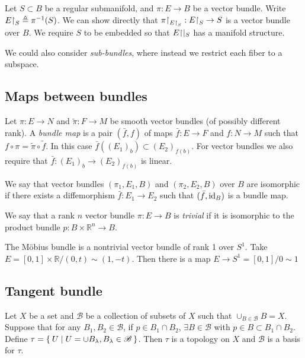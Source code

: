 \begin{xmpl}
Let $S \subset B$ be a regular submanifold, and
$\pi: E \to B$ be a vector bundle. Write
$E\mathord{\upharpoonright}_S \triangleq \pi^{-1}(S)$. We can show directly that
$\pi\mathord{\upharpoonright}_{E\mathord{\upharpoonright}_{S}}: E\mathord{\upharpoonright}_S \to S$ is a vector bundle
over $B$. We require $S$ to be embedded so that $E\mathord{\upharpoonright}|_S$ has a
manifold structure.
\end{xmpl}

We could also consider \emph{sub-bundles}, where instead we restrict
each fiber to a subspace.

\subsection{Maps between bundles}
\begin{defn}
Let $\pi: E \to N$ and $\tilde{\pi}: F \to M$ be smooth vector bundles
(of possibly different rank). A \emph{bundle map} is a pair
$(\bar{f}, f)$ of maps $\bar{f}: E \to F$ and $f: N \to M$ such that
$f \circ \pi = \tilde{\pi} \circ \tilde{f}$. In this case
$\bar{f}((E_1)_b) \subset (E_2)_{f(b)}$. For vector bundles we also
require that $\bar{f}: (E_1)_b \to (E_2)_{f(b)}$ is linear.
\end{defn}

\begin{defn}
We say that vector bundles $(\pi_1, E_1, B)$ and
$(\pi_2, E_2, B)$ over $B$ are isomorphic if there exists a
diffemorphism $\bar{f}: E_1 \to E_2$ such that
$(\bar{f}, \mathrm{id}_B)$ is a bundle map.
\end{defn}

\begin{defn}
We say that a rank $n$ vector bundle $\pi: E \to B$ is \emph{trivial} if it is
isomorphic to the product bundle $p: B \times \mathbb{R}^n \to B$.
\end{defn}

\begin{xmpl}
The M\"obius bundle is a nontrivial vector bundle of rank 1 over
$S^1$. Take $E = [0, 1] \times \mathbb{R} / (0, t) \sim (1, -t)$. Then
there is a map $E \to S^1 = [0, 1] / 0 \sim 1$
\end{xmpl}

\subsection{Tangent bundle}
\begin{prop}
Let $X$ be a set and $\mathscr{B}$ be a collection of
subsets of $X$ such that $\cup_{B \in \mathscr{B}} B = X$.
Suppose that for any $B_1, B_2 \in \mathscr{B}$, if $p \in B_1 \cap
B_2$, $\exists B \in \mathscr{B}$ with $p \in B \subset B_1 \cap B_2$.
Define $\tau = \Set{U | U = \cup B_\lambda, B_\lambda \in
\mathscr{B}}$.
Then $\tau$ is a topology on $X$ and $\mathscr{B}$ is a basis for $\tau$.
\end{prop}

